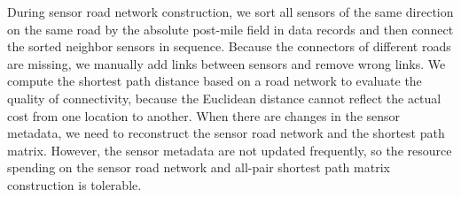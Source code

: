 During sensor road network construction, we sort all sensors of the same direction on the same road by the absolute post-mile field in data records and then connect the sorted neighbor sensors in sequence. Because the connectors of different roads are
missing, we manually add links between sensors and remove wrong links. We compute the shortest path distance based on a road network to evaluate the quality of connectivity, because the Euclidean distance cannot reflect the actual cost from one location to another. 
When there are changes in the sensor metadata, we need to reconstruct the sensor road network and the shortest path matrix. However, the sensor metadata are not updated frequently, so the resource spending on the sensor road network and all-pair shortest path matrix construction is tolerable.
